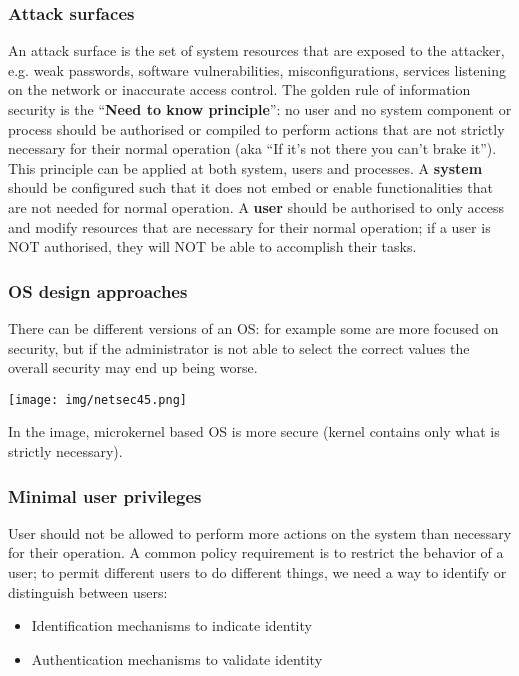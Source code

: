\documentclass[a4paper, 10pt, titlepage]{article}
\begin{document}
\subsubsection*{Attack surfaces}
An attack surface is the set of system resources that are exposed to the attacker, e.g. weak passwords, software vulnerabilities, misconfigurations, services listening on the network or inaccurate access control.
The golden rule of information security is the “\textbf{Need to know principle}”: no user and no system component or process should be authorised or compiled to perform actions that are not strictly necessary for their normal operation (aka “If it’s not there you can’t brake it”). This principle can be applied at both system, users and processes. A \textbf{system} should be configured such that it does not embed or enable functionalities that are not needed for normal operation. A \textbf{user} should be authorised to only access and modify resources that are necessary for their normal operation; if a user is NOT authorised, they will NOT be able to accomplish their tasks.

\subsubsection*{OS design approaches}
There can be different versions of an OS: for example some are more focused on security, but if the administrator is not able to select the correct values the overall security may end up being worse.
\begin{center}
	\texttt{[image: img/netsec45.png]}
\end{center}
In the image, microkernel based OS is more secure (kernel contains only what is strictly necessary).

\subsubsection*{Minimal user privileges}
User should not be allowed to perform more actions on the system than necessary for their operation. A common policy requirement is to restrict the behavior of a user; to permit different users to do different things, we need a way to identify or distinguish between
users:
\begin{itemize}
	\item Identification mechanisms to indicate identity
	\item Authentication mechanisms to validate identity
\end{itemize}
\end{document}
